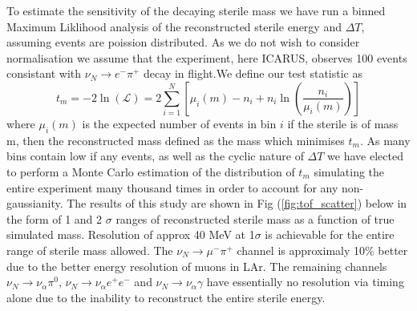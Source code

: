 \documentclass[11pt, a4paper]{article}
\begin{document}
To estimate the sensitivity of the decaying sterile mass we have run a binned Maximum Liklihood analysis of the reconstructed sterile energy and $\Delta T$, assuming events are poission distributed. As we do not wish to consider normalisation we assume that the experiment, here ICARUS, observes 100 events consistant with $\nu_N\rightarrow e^- \pi^+$ decay in flight.We define our test statistic as \[
	t_m = -2 \ln \left(\mathcal{L}\right) =  2 \sum_{i=1}^N \left[ \mu_i(m)-n_i +n_i \ln(\frac{n_i}{\mu_i(m)})  \right]
\]
where $\mu_i(m)$ is the expected number of events in bin $i$ if the sterile is of mass m, then the reconstructed mass defined as the mass which minimises $t_m$. As many bins contain low if any events, as well as the cyclic nature of $\Delta T$ we have elected to perform a Monte Carlo estimation of the distribution of $t_m$ simulating the entire experiment many thousand times in order to account for any non-gaussianity. The results of this study are shown in Fig (\ref{fig:tof_scatter}) below in the form of 1 and 2 $\sigma$ ranges of reconstructed sterile mass as a function of true simulated mass. Resolution of approx 40 MeV at 1$\sigma$ is achievable for the entire range of sterile mass allowed. The  $\nu_N\rightarrow \mu^- \pi^+$ channel is approximaly 10\% better due to the better energy resolution of muons in LAr. The remaining channels $\nu_N\rightarrow \nu_\alpha \pi^0$, $\nu_N\rightarrow \nu_\alpha e^+ e^-$ and $\nu_N\rightarrow \nu_\alpha \gamma$ have essentially no resolution via timing alone due to the inability to reconstruct the entire sterile energy.
\end{document}
